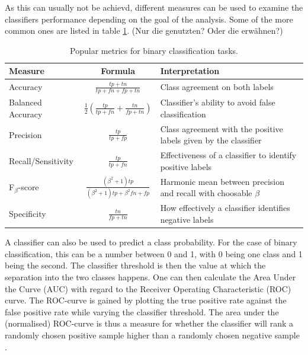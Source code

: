 As this can usually not be achievd, different measures
can be used to examine the classifiers performance
depending on the goal of the analysis.
Some of the more common ones are listed in table \ref{tab:class_metrics}.
(Nur die genutzten? Oder die erwähnen?)

\begin{table}
    \caption{Popular metrics for binary classification tasks.}
    \begin{center}
        \begin{tabularx}{\textwidth}{l c X}
            Measure & Formula & Interpretation \\
            \hline
            Accuracy & $\frac{tp+tn}{tp+fn+fp+tn}$ & Class agreement on both labels \\
            Balanced Accuracy & $\frac{1}{2}(\frac{tp}{tp+fn}+\frac{tn}{fp+tn})$ & Classifier’s ability to avoid false classification \\
            Precision & $\frac{tp}{tp+fp}$ & Class agreement with the positive labels given by the classifier \\
            Recall/Sensitivity & $\frac{tp}{tp+fn}$ & Effectiveness of a classifier to identify positive labels \\
            F$_{\beta}$-score & $\frac{(\beta^2+1)tp}{(\beta^2+1)tp+\beta^2fn+fp}$ & Harmonic mean between precision and recall with choosable $\beta$ \\
            Specificity & $\frac{tn}{fp+tn}$ & How effectively a classifier identifies negative labels \\
        \end{tabularx}
    \end{center}
    \label{tab:class_metrics}
\end{table}

A classifier can also be used to predict a class probability.
For the case of binary classification, this can be a number between 0 and 1,
with 0 being one class and 1 being the second.
The classifier threshold is then the value at which the separation into the two classes happens.
One can then calculate the Area Under the Curve (AUC) with regard to the Receiver Operating Characteristic (ROC) curve.
The ROC-curve is gained by plotting the true positive rate against the false positive rate while varying the classifier threshold.
The area under the (normalised) ROC-curve is thus a measure for whether the classifier will
rank a randomly chosen positive sample higher than a randomly chosen negative sample \cite{FAWCETT2006861}.

